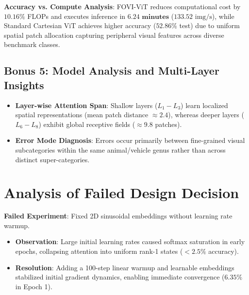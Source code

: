 \documentclass[10pt,conference]{IEEEtran}
\begin{document}
\begin{table}[h]
\centering
\caption{Individual Accuracy and Computational FLOPs Comparison}
\label{tab:accuracy_flops_summary}
\end{table}

\textbf{Accuracy vs. Compute Analysis}:
FOVI-ViT reduces computational cost by $\mathbf{10.16\%}$ FLOPs and executes inference in $\mathbf{6.24\text{ minutes}}$ ($133.52\text{ img/s}$), while Standard Cartesian ViT achieves higher accuracy ($52.86\%$ test) due to uniform spatial patch allocation capturing peripheral visual features across diverse benchmark classes.

\subsection{Bonus 5: Model Analysis and Multi-Layer Insights}
\begin{itemize}
    \item \textbf{Layer-wise Attention Span}: Shallow layers ($L_1 - L_3$) learn localized spatial representations (mean patch distance $\approx 2.4$), whereas deeper layers ($L_6 - L_8$) exhibit global receptive fields ($\approx 9.8$ patches).
    \item \textbf{Error Mode Diagnosis}: Errors occur primarily between fine-grained visual subcategories within the same animal/vehicle genus rather than across distinct super-categories.
\end{itemize}

\section{Analysis of Failed Design Decision}
\textbf{Failed Experiment}: Fixed 2D sinusoidal embeddings without learning rate warmup.
\begin{itemize}
    \item \textbf{Observation}: Large initial learning rates caused softmax saturation in early epochs, collapsing attention into uniform rank-1 states ($<2.5\%$ accuracy).
    \item \textbf{Resolution}: Adding a 100-step linear warmup and learnable embeddings stabilized initial gradient dynamics, enabling immediate convergence ($6.35\%$ in Epoch 1).
\end{itemize}
\end{document}
